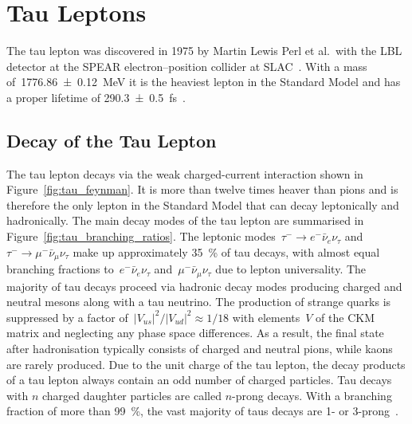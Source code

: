 \section{Tau Leptons}

The tau lepton was discovered in 1975 by Martin Lewis Perl et al.\ with the LBL
detector at the SPEAR electron--position collider at SLAC~\cite{perl}. With a
mass of~\SI{1776.86 +- 0.12}{\MeV} it is the heaviest lepton in the Standard
Model and has a proper lifetime of \SI{290.3 +- 0.5}{\femto\second}~\cite{pdg}.

\subsection{Decay of the Tau Lepton}

The tau lepton decays via the weak charged-current interaction shown in
Figure~\ref{fig:tau_feynman}. It is more than twelve times heaver than pions and
is therefore the only lepton in the Standard Model that can decay leptonically
and hadronically. The main decay modes of the tau lepton are summarised in
Figure~\ref{fig:tau_branching_ratios}. The leptonic
modes~\mbox{$\tau^- \to e^- \bar{\nu}_e \nu_\tau$}
and~\mbox{$\tau^- \to \mu^- \bar{\nu}_\mu \nu_\tau$} make up approximately
\SI{35}{\percent} of tau decays, with almost equal branching fractions
to~$e^- \bar{\nu}_e \nu_\tau$ and~$\mu^- \bar{\nu}_\mu \nu_\tau$ due to lepton
universality. The majority of tau decays proceed via hadronic decay modes
producing charged and neutral mesons along with a tau neutrino. The production
of strange quarks is suppressed by a factor
of~$|V_{us}|^2 / |V_{ud}|^2 \approx 1/18$ with elements~$V$ of the CKM matrix
and neglecting any phase space differences. As a result, the final state after
hadronisation typically consists of charged and neutral pions, while kaons are
rarely produced. Due to the unit charge of the tau lepton, the decay products of
a tau lepton always contain an odd number of charged particles. Tau decays with
$n$ charged daughter particles are called $n$-prong decays. With a branching
fraction of more than \SI{99}{\percent}, the vast majority of taus decays are 1-
or 3-prong~\cite{pdg}.

